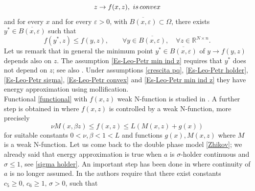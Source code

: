 \documentclass[a4paper,10pt]{article}
\newcommand{\numberset}{\mathbb}
\newcommand{\R}{\numberset{R}}
\theoremstyle{plain}
\theoremstyle{definition}
\def\R{\mathbb{R}}
\numberwithin{equation}{section} \makeatletter
\begin{document}
\begin{equation}\label{Es-Leo-Petr convex}
 z \rightarrow f(x,z), \,\, {\rm is \, convex}  
\end{equation}
and for every $x$  and  for every $\varepsilon>0$,  with $\overline{B(x,\varepsilon)}\subset \Omega$, there exists $y^* \in \overline{B(x,\varepsilon)}$ such that
  \begin{equation}\label{Es-Leo-Petr min ind z}   f(y^*,z) \le f(y,z), \qquad \forall y \in \overline{B(x,\varepsilon)},\quad  \forall z \in \R^{N\times n} .  
  \end{equation}
Let us remark that in general the minimum point $y^* \in \overline{B(x,\varepsilon)}$ of $y \rightarrow f(y,z)$ depends also on $z$. The assumption \eqref{Es-Leo-Petr min ind z} requires that $y^*$ does not depend on $z$; see also \cite{Koch}.
\noindent
Under assumptions \eqref{crescita pq}, \eqref{Es-Leo-Petr holder}, \eqref{Es-Leo-Petr sigma}, \eqref{Es-Leo-Petr convex} and \eqref{Es-Leo-Petr min ind z} they have energy approximation using mollification. \\
Functional  \eqref{functional} with $f(x,z)$ weak N-function is studied in \cite{BC}. A further step is obtained in \cite{BCM} where $f(x,z)$ is controlled by a weak N-function, more precisely 
\begin{equation}\label{hp structure BCM}
 \nu M(x,\beta z)\le f(x,z) \le L(M(x,z)+ g(x))
\end{equation}
for suitable constants $0<\nu, \beta <1 <L$ and functions $g(x), M(x,z)$ where $M$ is a weak N-function. 
\vspace{0,2cm}
Let us come back to the double phase model \eqref{Zhikov}; we already said that energy approximation is true when $a$ is $\sigma$-holder continuous and $\sigma \le 1$, see \eqref{sigma holder}. An important step has been done in \cite{BCDFM} where continuity of $a$ is no longer assumed. 
In \cite{BCDFM} the authors require that there exist %
constants $c_5\ge 0, \,  c_6\ge 1, \, \sigma>0$, such that 
\end{document}
